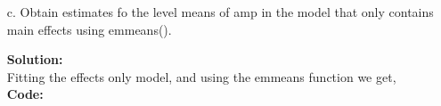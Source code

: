 \documentclass[12pt]{article}
\makeatletter
\theoremstyle{homework}
\newenvironment{exercise}[1]
{\def\@currentlabel{#1}\exercisecore}
{\endexercisecore}
\newcommand{\localhead}[1]{\par\smallskip\noindent\textbf{#1}\nobreak\\}%
\newcommand\solution{\localhead{Solution:}}
\makeatother
\begin{document}
\begin{exercise}{3}
\begin{enumerate}
     \item[c.]Obtain estimates fo the level means of amp in the model that only contains main effects using emmeans().\\
     \solution Fitting the effects only model, and using the emmeans function we get, \\
     \textbf{Code:}
     \begin{center}
     
     \end{center}
  \end{enumerate}
\end{exercise}
\end{document}
